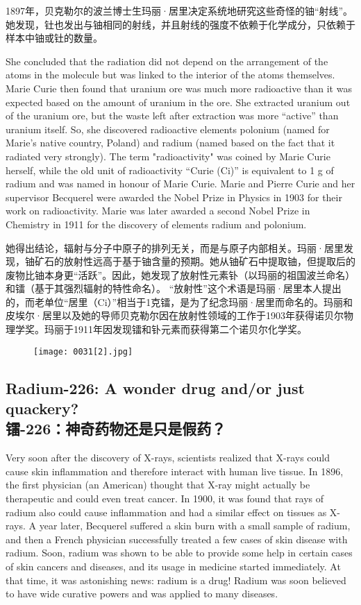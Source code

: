 \documentclass[dvipsnames, svgnames,a4paper,11pt]{article}
\begin{document}
1897年，贝克勒尔的波兰博士生玛丽·居里决定系统地研究这些奇怪的铀“射线”。她发现，钍也发出与铀相同的射线，并且射线的强度不依赖于化学成分，只依赖于样本中铀或钍的数量。

She concluded that the radiation did not depend on the arrangement of the atoms in the molecule but was linked to the interior of the atoms themselves. Marie Curie then found that uranium ore was much more radioactive than it was expected based on the amount of uranium in the ore. She extracted uranium out of the uranium ore, but the waste left after extraction was more “active” than uranium itself. So, she discovered radioactive elements polonium (named for Marie’s native country, Poland) and radium (named based on the fact that it radiated very strongly). The term "radioactivity" was coined by Marie Curie herself, while the old unit of radioactivity “Curie (Ci)” is equivalent to 1 g of radium and was named in honour of Marie Curie. Marie and Pierre Curie and her supervisor Becquerel were awarded the Nobel Prize in Physics in 1903 for their work on radioactivity. Marie was later awarded a second Nobel Prize in Chemistry in 1911 for the discovery of elements radium and polonium.

她得出结论，辐射与分子中原子的排列无关，而是与原子内部相关。玛丽·居里发现，铀矿石的放射性远高于基于铀含量的预期。她从铀矿石中提取铀，但提取后的废物比铀本身更“活跃”。因此，她发现了放射性元素钋（以玛丽的祖国波兰命名）和镭（基于其强烈辐射的特性命名）。 “放射性”这个术语是玛丽·居里本人提出的，而老单位“居里（Ci）”相当于1克镭，是为了纪念玛丽·居里而命名的。玛丽和皮埃尔·居里以及她的导师贝克勒尔因在放射性领域的工作于1903年获得诺贝尔物理学奖。玛丽于1911年因发现镭和钋元素而获得第二个诺贝尔化学奖。

\begin{figure}[htbp]
      \centering
      \texttt{[image: 0031[2].jpg]}
       \label{fig18}
\end{figure}

\subsection{Radium-226: A wonder drug and/or just quackery?\\镭-226：神奇药物还是只是假药？}
Very soon after the discovery of X-rays, scientists realized that X-rays could cause skin inflammation and therefore interact with human live tissue. In 1896, the first physician (an American) thought that X-ray might actually be therapeutic and could even treat cancer. In 1900, it was found that rays of radium also could cause inflammation and had a similar effect on tissues as X-rays. A year later, Becquerel suffered a skin burn with a small sample of radium, and then a French physician successfully treated a few cases of skin disease with radium. Soon, radium was shown to be able to provide some help in certain cases of skin cancers and diseases, and its usage in medicine started immediately. At that time, it was astonishing news: radium is a drug! Radium was soon believed to have wide curative powers and was applied to many diseases.
\end{document}
